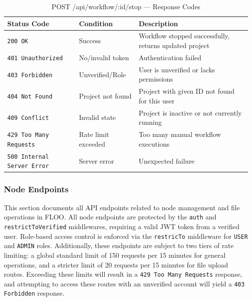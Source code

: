 \begin{table}[H]
\centering
\renewcommand{\arraystretch}{1.3}
\begin{tabularx}{\textwidth}{|l|l|X|}
\hline
\textbf{Status Code} & \textbf{Condition} & \textbf{Description} \\
\hline
\texttt{200 OK}           & Success              & Workflow stopped successfully, returns updated project \\
\hline
\texttt{401 Unauthorized} & No/invalid token     & Authentication failed \\
\hline
\texttt{403 Forbidden}    & Unverified/Role      & User is unverified or lacks permissions \\
\hline
\texttt{404 Not Found}    & Project not found    & Project with given ID not found for this user \\
\hline
\texttt{409 Conflict}     & Invalid state        & Project is inactive or not currently running \\
\hline
\texttt{429 Too Many Requests} & Rate limit exceeded & Too many manual workflow executions \\
\hline
\texttt{500 Internal Server Error} & Server error & Unexpected failure \\
\hline
\end{tabularx}
\caption{POST /api/workflow/:id/stop — Response Codes}
\label{tab:stop-workflow-responses}
\end{table}
\FloatBarrier
\subsubsection{Node Endpoints}
\label{subsec:node-endpoints}

This section documents all API endpoints related to node management and file operations in FLOO.
All node endpoints are protected by the \texttt{auth} and \texttt{restrictToVerified} middlewares, requiring a valid JWT token from a verified user.
Role-based access control is enforced via the \texttt{restricTo} middleware for \texttt{USER} and \texttt{ADMIN} roles.
Additionally, these endpoints are subject to two tiers of rate limiting: a global standard limit of 150 requests per 15 minutes for general operations, and a stricter limit of 20 requests per 15 minutes for file upload routes.
Exceeding these limits will result in a \texttt{429 Too Many Requests} response, and attempting to access these routes with an unverified account will yield a \texttt{403 Forbidden} response.

